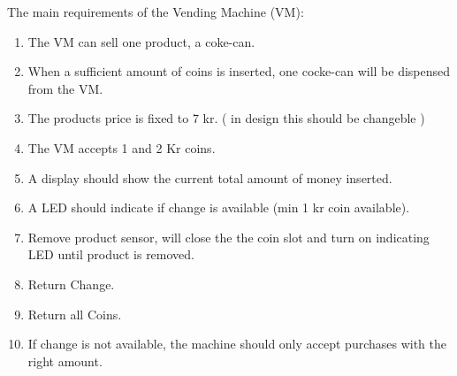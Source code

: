 The main requirements of the Vending Machine (VM):

\begin{enumerate}
\item The VM can sell one product, a coke-can.
\item When a sufficient amount of coins is inserted, one cocke-can will be dispensed from the VM.
\item The products price is fixed to 7 kr. ( in design this should be changeble )
\item The VM accepts 1 and 2 Kr coins.
\item A display should show the current total amount of money inserted.
\item A LED should indicate if change is available (min 1 kr coin available).
\item Remove product sensor, will close the the coin slot and turn on indicating LED until product is removed.
\item Return Change.
\item Return all Coins.
\item If change is not available, the machine should only accept purchases with the right amount.
\end{enumerate}

